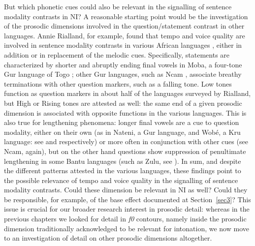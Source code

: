But which phonetic cues could also be relevant in the signalling of sentence modality contrasts in NI? A reasonable starting point would be the investigation of the prosodic dimensions involved in the question/statement contrast in other languages. Annie Rialland, for example, found that tempo and voice quality are involved in sentence modality contrasts in various African languages \citep{rialland2007question}, either in addition or in replacement of the melodic cues. Specifically, statements are characterized by shorter and abruptly ending final vowels in Moba, a four-tone Gur language of Togo \citep{rialland1984fini}; other Gur languages, such as Ncam \citep{podi1995esquisse}, associate breathy terminations with other question markers, such as a falling tone. Low tones function as question markers in about half of the languages surveyed by Rialland, but High or Rising tones are attested as well: the same end of a given prosodic dimension is associated with opposite functions in the various languages. This is also true for lengthening phenomena: longer final vowels are a cue to question modality, either on their own (as in Nateni, a Gur language, and Wobé, a Kru language: see \citealt{neukom1995description} and \citealt{marchese1978atlas} respectively) or more often in conjunction with other cues (see Ncam, again), but on the other hand questions show suppression of penultimate lengthening in some Bantu languages (such as Zulu, see \citealt{taljaard1988handbook}). In sum, and despite the different patterns attested in the various languages, these findings point to the possible relevance of tempo and voice quality in the signalling of sentence modality contrasts. Could these dimension be relevant in NI as well? Could they be responsible, for example, of the base effect documented at Section~\ref{sec3}? This issue is crucial for our broader research interest in prosodic detail: whereas in the previous chapters we looked for detail in \textit{f0} contours, namely inside the prosodic dimension traditionally acknowledged to be relevant for intonation, we now move to an investigation of detail on other prosodic dimensions altogether.

